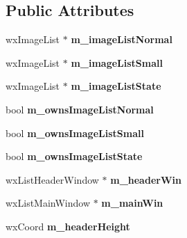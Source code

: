 \subsection*{Public Attributes}
\begin{DoxyCompactItemize}
\item 
wxImageList $\ast$ {\bfseries m\_\-imageListNormal}\label{classMuleExtern_1_1wxGenericListCtrl_acc6adfcef135b118cae5bdf7f8673b0d}

\item 
wxImageList $\ast$ {\bfseries m\_\-imageListSmall}\label{classMuleExtern_1_1wxGenericListCtrl_a341485baeb82a4ab8eb405a4ad0ac084}

\item 
wxImageList $\ast$ {\bfseries m\_\-imageListState}\label{classMuleExtern_1_1wxGenericListCtrl_a9f590ddcf6d20bac017ccb7ce1ce0ce0}

\item 
bool {\bfseries m\_\-ownsImageListNormal}\label{classMuleExtern_1_1wxGenericListCtrl_ae793bd2f47b3615b5f2536897dc6935e}

\item 
bool {\bfseries m\_\-ownsImageListSmall}\label{classMuleExtern_1_1wxGenericListCtrl_a1479ff91c5b75fee589131404a97eb95}

\item 
bool {\bfseries m\_\-ownsImageListState}\label{classMuleExtern_1_1wxGenericListCtrl_aef4ba6d011fce24c909ba84e54eb0a4e}

\item 
wxListHeaderWindow $\ast$ {\bfseries m\_\-headerWin}\label{classMuleExtern_1_1wxGenericListCtrl_a516482033c7b1e4715b752cfaa318715}

\item 
wxListMainWindow $\ast$ {\bfseries m\_\-mainWin}\label{classMuleExtern_1_1wxGenericListCtrl_a559eb8ab289441d3926b3bd817bbbbd8}

\item 
wxCoord {\bfseries m\_\-headerHeight}\label{classMuleExtern_1_1wxGenericListCtrl_a7045fc790d4a3b0596e60d62c9e06167}

\end{DoxyCompactItemize}
